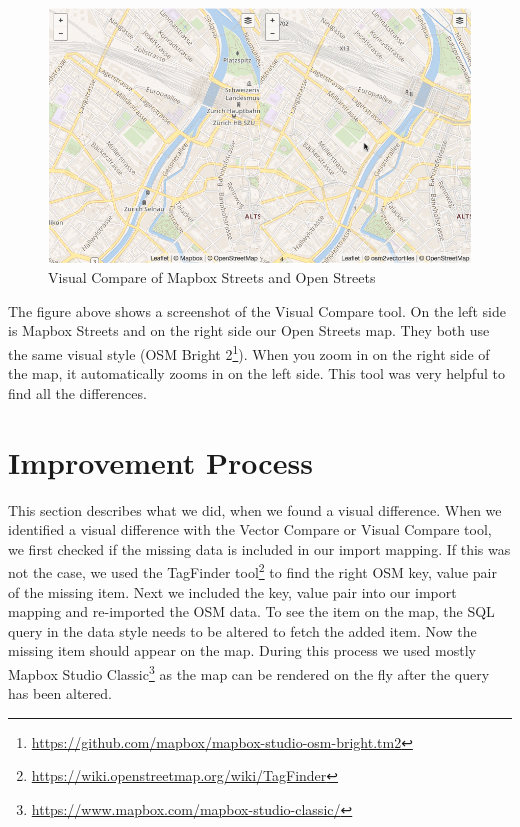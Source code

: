 \begin{figure}[H]
  \centering
  \includegraphics[width=1\textwidth]{images/visual_compare.png}
  \caption{Visual Compare of Mapbox Streets and Open Streets}
\end{figure}

The figure above shows a screenshot of the Visual Compare tool. On the left side is Mapbox Streets and on the right side our Open Streets map. They both use the same visual style (OSM Bright 2\footnote{\url{https://github.com/mapbox/mapbox-studio-osm-bright.tm2}}). When you zoom in on the right side of the map, it automatically zooms in on the left side. This tool was very helpful to find all the differences.

\section{Improvement Process}
This section describes what we did, when we found a visual difference. When we identified a visual difference with the Vector Compare or Visual Compare tool, we first checked if the missing data is included in our import mapping. If this was not the case, we used the TagFinder tool\footnote{\url{https://wiki.openstreetmap.org/wiki/TagFinder}} to find the right OSM key, value pair of the missing item. Next we included the key, value pair into our import mapping and re-imported the OSM data. To see the item on the map, the SQL query in the data style needs to be altered to fetch the added item. Now the missing item should appear on the map. During this process we used mostly Mapbox Studio Classic\footnote{\url{https://www.mapbox.com/mapbox-studio-classic/}} as the map can be rendered on the fly after the query has been altered.



